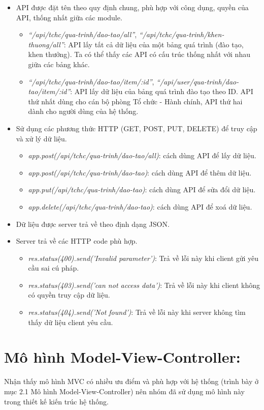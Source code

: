 \begin{itemize}
    \item API được đặt tên theo quy định chung, phù hợp với công dụng, quyền của API, thống nhất giữa các module.
    \begin{itemize}
        \item  \textit{``/api/tchc/qua-trinh/dao-tao/all''}, \textit{``/api/tchc/qua-trinh/khen-thuong/all''}: API lấy tất cả dữ liệu của một bảng quá trình (đào tạo, khen thưởng). Ta có thể thấy các API có cấu trúc thống nhất với nhau giữa các bảng khác.
        \item  \textit{``/api/tchc/qua-trinh/dao-tao/item/:id''}, \textit{``/api/user/qua-trinh/dao-tao/item/:id''}: API lấy dữ liệu của bảng quá trình đào tạo theo ID. API thứ nhất dùng cho cán bộ phòng Tổ chức - Hành chính, API thứ hai dành cho người dùng của hệ thống.
    \end{itemize}
    \item Sử dụng các phương thức HTTP (GET, POST, PUT, DELETE) để truy cập và xử lý dữ liệu.
    \begin{itemize}
        \item  \textit{app.post(/api/tchc/qua-trinh/dao-tao/all)}: cách dùng API để lấy dữ liệu.
        \item  \textit{app.post(/api/tchc/qua-trinh/dao-tao)}: cách dùng API để thêm dữ liệu.
        \item  \textit{app.put(/api/tchc/qua-trinh/dao-tao)}: cách dùng API để sửa đổi dữ liệu.
        \item  \textit{app.delete(/api/tchc/qua-trinh/dao-tao)}: cách dùng API để xoá dữ liệu.
    \end{itemize}
    \item Dữ liệu được server trả về theo định dạng JSON.
    \item Server trả về các HTTP code phù hợp.
    \begin{itemize}
        \item  \textit{res.status(400).send('Invalid parameter')}: Trả về lỗi này khi client gửi yêu cầu sai cú pháp.
        \item  \textit{res.status(403).send('can not access data')}: Trả về lỗi này khi client không có quyền truy cập dữ liệu.
        \item  \textit{res.status(404).send('Not found')}: Trả về lỗi này khi server không tìm thấy dữ liệu client yêu cầu.
    \end{itemize}
\end{itemize}
\section{Mô hình Model-View-Controller:}
Nhận thấy mô hình MVC có nhiều ưu điểm và phù hợp với hệ thống (trình bày ở mục 2.1 Mô hình Model-View-Controller) nên nhóm đã sử dụng mô hình này trong thiết kế kiến trúc hệ thống.

